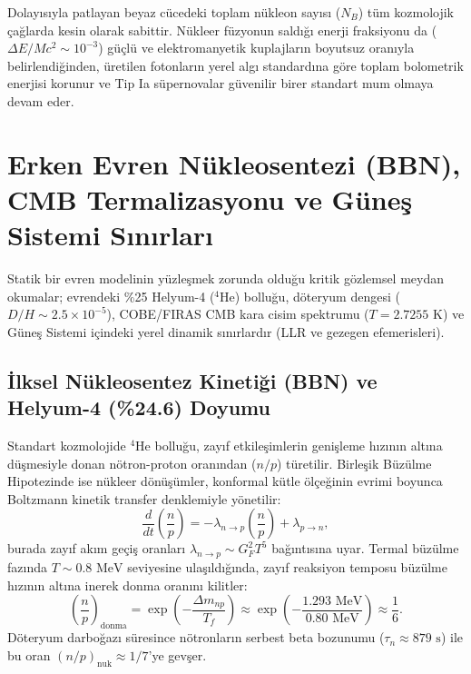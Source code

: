 \documentclass[11pt,a4paper]{article}
\begin{document}
Dolayısıyla patlayan beyaz cücedeki toplam nükleon sayısı ($N_B$) tüm kozmolojik çağlarda kesin olarak sabittir. Nükleer füzyonun saldığı enerji fraksiyonu da ($\Delta E / M c^2 \sim 10^{-3}$) güçlü ve elektromanyetik kuplajların boyutsuz oranıyla belirlendiğinden, üretilen fotonların yerel algı standardına göre toplam bolometrik enerjisi korunur ve Tip Ia süpernovalar güvenilir birer standart mum olmaya devam eder.

\section{Erken Evren Nükleosentezi (BBN), CMB Termalizasyonu ve Güneş Sistemi Sınırları}
\label{sec:bbn_ve_termalizasyon_makale_a}

Statik bir evren modelinin yüzleşmek zorunda olduğu kritik gözlemsel meydan okumalar; evrendeki \%25 Helyum-4 ($^4\mathrm{He}$) bolluğu, döteryum dengesi ($D/H \sim 2.5 \times 10^{-5}$), COBE/FIRAS CMB kara cisim spektrumu ($T = 2.7255\text{ K}$) ve Güneş Sistemi içindeki yerel dinamik sınırlardır (LLR ve gezegen efemerisleri).

\subsection{İlksel Nükleosentez Kinetiği (BBN) ve Helyum-4 (\%24.6) Doyumu}
Standart kozmolojide $^4\mathrm{He}$ bolluğu, zayıf etkileşimlerin genişleme hızının altına düşmesiyle donan nötron-proton oranından ($n/p$) türetilir. Birleşik Büzülme Hipotezinde ise nükleer dönüşümler, konformal kütle ölçeğinin evrimi boyunca Boltzmann kinetik transfer denklemiyle yönetilir:
\begin{equation}
    \frac{d}{dt}\left(\frac{n}{p}\right) = -\lambda_{n \to p} \left(\frac{n}{p}\right) + \lambda_{p \to n},
    \label{eq:bbn_kinetik}
\end{equation}
burada zayıf akım geçiş oranları $\lambda_{n \to p} \sim G_F^2 T^5$ bağıntısına uyar. Termal büzülme fazında $T \sim 0.8\text{ MeV}$ seviyesine ulaşıldığında, zayıf reaksiyon temposu büzülme hızının altına inerek donma oranını kilitler:
\begin{equation}
    \left(\frac{n}{p}\right)_{\mathrm{donma}} = \exp\left(-\frac{\Delta m_{np}}{T_f}\right) \approx \exp\left(-\frac{1.293\text{ MeV}}{0.80\text{ MeV}}\right) \approx \frac{1}{6}.
\end{equation}
Döteryum darboğazı süresince nötronların serbest beta bozunumu ($\tau_n \approx 879\text{ s}$) ile bu oran $(n/p)_{\mathrm{nuk}} \approx 1/7$'ye gevşer. 
\end{document}
